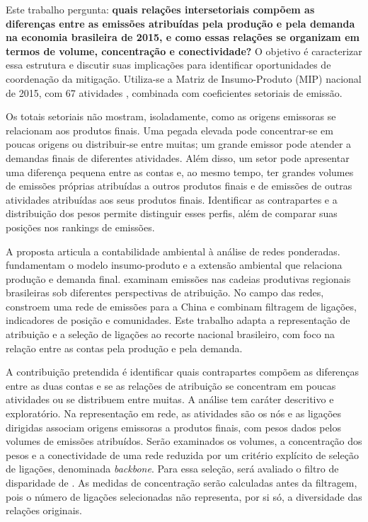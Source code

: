 Este trabalho pergunta: \textbf{quais relações intersetoriais compõem as diferenças entre as emissões atribuídas pela produção e pela demanda na economia brasileira de 2015, e como essas relações se organizam em termos de volume, concentração e conectividade?} O objetivo é caracterizar essa estrutura e discutir suas implicações para identificar oportunidades de coordenação da mitigação. Utiliza-se a Matriz de Insumo-Produto (MIP) nacional de 2015, com 67 atividades \parencite{ibge2015mip}, combinada com coeficientes setoriais de emissão.

Os totais setoriais não mostram, isoladamente, como as origens emissoras se relacionam aos produtos finais. Uma pegada elevada pode concentrar-se em poucas origens ou distribuir-se entre muitas; um grande emissor pode atender a demandas finais de diferentes atividades. Além disso, um setor pode apresentar uma diferença pequena entre as contas e, ao mesmo tempo, ter grandes volumes de emissões próprias atribuídas a outros produtos finais e de emissões de outras atividades atribuídas aos seus produtos finais. Identificar as contrapartes e a distribuição dos pesos permite distinguir esses perfis, além de comparar suas posições nos rankings de emissões.

A proposta articula a contabilidade ambiental à análise de redes ponderadas. \textcite{millerBlair2009} fundamentam o modelo insumo-produto e a extensão ambiental que relaciona produção e demanda final. \textcite{sanguinetAzzoni2024} examinam emissões nas cadeias produtivas regionais brasileiras sob diferentes perspectivas de atribuição. No campo das redes, \textcite{huang2019} constroem uma rede de emissões para a China e combinam filtragem de ligações, indicadores de posição e comunidades. Este trabalho adapta a representação de atribuição e a seleção de ligações ao recorte nacional brasileiro, com foco na relação entre as contas pela produção e pela demanda.

A contribuição pretendida é identificar quais contrapartes compõem as diferenças entre as duas contas e se as relações de atribuição se concentram em poucas atividades ou se distribuem entre muitas. A análise tem caráter descritivo e exploratório. Na representação em rede, as atividades são os nós e as ligações dirigidas associam origens emissoras a produtos finais, com pesos dados pelos volumes de emissões atribuídos. Serão examinados os volumes, a concentração dos pesos e a conectividade de uma rede reduzida por um critério explícito de seleção de ligações, denominada \textit{backbone}. Para essa seleção, será avaliado o filtro de disparidade de \textcite{serrano2009}. As medidas de concentração serão calculadas antes da filtragem, pois o número de ligações selecionadas não representa, por si só, a diversidade das relações originais.

